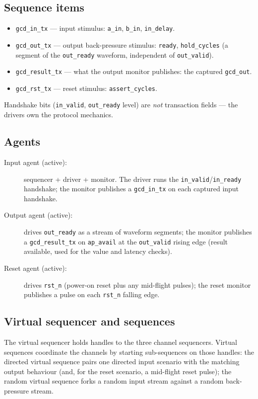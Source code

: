 \documentclass[11pt,a4paper]{article}
\begin{document}
\subsection*{Sequence items}
\begin{itemize}
    \item \texttt{gcd\_in\_tx} --- input stimulus: \texttt{a\_in}, \texttt{b\_in}, \texttt{in\_delay}.
    \item \texttt{gcd\_out\_tx} --- output back-pressure stimulus: \texttt{ready}, \texttt{hold\_cycles} (a segment of the \texttt{out\_ready} waveform, independent of \texttt{out\_valid}).
    \item \texttt{gcd\_result\_tx} --- what the output monitor publishes: the captured \texttt{gcd\_out}.
    \item \texttt{gcd\_rst\_tx} --- reset stimulus: \texttt{assert\_cycles}.
\end{itemize}
Handshake bits (\texttt{in\_valid}, \texttt{out\_ready} level) are \emph{not}
transaction fields --- the drivers own the protocol mechanics.

\subsection*{Agents}
\begin{description}
    \item[Input agent (active):] sequencer + driver + monitor. The driver runs the \texttt{in\_valid}/\texttt{in\_ready} handshake; the monitor publishes a \texttt{gcd\_in\_tx} on each captured input handshake.
    \item[Output agent (active):] drives \texttt{out\_ready} as a stream of waveform segments; the monitor publishes a \texttt{gcd\_result\_tx} on \texttt{ap\_avail} at the \texttt{out\_valid} rising edge (result available, used for the value and latency checks).
    \item[Reset agent (active):] drives \texttt{rst\_n} (power-on reset plus any mid-flight pulses); the reset monitor publishes a pulse on each \texttt{rst\_n} falling edge.
\end{description}

\subsection*{Virtual sequencer and sequences}
The virtual sequencer holds handles to the three channel sequencers. Virtual
sequences coordinate the channels by starting sub-sequences on those handles:
the directed virtual sequence pairs one directed input scenario with the matching
output behaviour (and, for the reset scenario, a mid-flight reset pulse); the
random virtual sequence forks a random input stream against a random
back-pressure stream.
\end{document}
